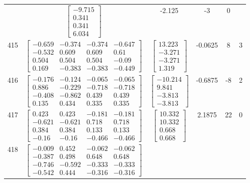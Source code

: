 \documentclass[a4paper,12pt]{article}
\begin{document}
\begin{tabular}{c c c c c c}
&
$\begin{bmatrix} -9.715 \\ 0.341 \\ 0.341 \\ 6.034 \end{bmatrix}$
&
-2.125
&
-3
&
0
\\
415
&
$\begin{bmatrix} -0.659 & -0.374 & -0.374 & -0.647 \\ -0.532 & 0.609 & 0.609 & 0.61 \\ 0.504 & 0.504 & 0.504 & -0.09 \\ 0.169 & -0.383 & -0.383 & -0.449 \end{bmatrix}$
&
$\begin{bmatrix} 13.223 \\ -3.271 \\ -3.271 \\ 1.319 \end{bmatrix}$
&
-0.0625
&
8
&
3
\\
416
&
$\begin{bmatrix} -0.176 & -0.124 & -0.065 & -0.065 \\ 0.886 & -0.229 & -0.718 & -0.718 \\ -0.408 & -0.862 & 0.439 & 0.439 \\ 0.135 & 0.434 & 0.335 & 0.335 \end{bmatrix}$
&
$\begin{bmatrix} -10.214 \\ 9.841 \\ -3.813 \\ -3.813 \end{bmatrix}$
&
-0.6875
&
-8
&
2
\\
417
&
$\begin{bmatrix} 0.423 & 0.423 & -0.181 & -0.181 \\ -0.621 & -0.621 & 0.718 & 0.718 \\ 0.384 & 0.384 & 0.133 & 0.133 \\ -0.16 & -0.16 & -0.466 & -0.466 \end{bmatrix}$
&
$\begin{bmatrix} 10.332 \\ 10.332 \\ 0.668 \\ 0.668 \end{bmatrix}$
&
2.1875
&
22
&
0
\\
418
&
$\begin{bmatrix} -0.009 & 0.452 & -0.062 & -0.062 \\ -0.387 & 0.498 & 0.648 & 0.648 \\ -0.746 & -0.592 & -0.333 & -0.333 \\ -0.542 & 0.444 & -0.316 & -0.316 \end{bmatrix}$

\end{tabular}
\end{document}
